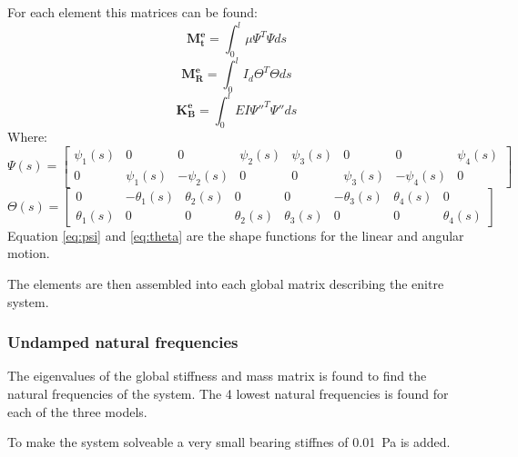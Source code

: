 For each element this matrices can be found:
\begin{equation}
    \mathbf{M_t^e} = \int_{0}^{l} \mu \Psi^T \Psi ds
    \label{eq:mass_matrix_linear}
\end{equation}
\begin{equation}
    \mathbf{M_R^e} = \int_{0}^{l} I_d \Theta^T \Theta ds
    \label{eq:mass_matrix_angular}
\end{equation}
\begin{equation}
    \mathbf{K_B^e} = \int_{0}^{l} E I \Psi''^T \Psi'' ds
\end{equation}
Where:
\begin{equation}
    \Psi(s) =
    \begin{bmatrix}
        \psi_1(s) & 0 & 0 & \psi_2(s) & \psi_3(s) & 0 & 0 & \psi_4(s) \\
        0 & \psi_1(s) & -\psi_2(s) & 0 & 0 & \psi_3(s) & -\psi_4(s) & 0
    \end{bmatrix}
    \label{eq:psi}
\end{equation}
\begin{equation}
    \Theta(s) = 
    \begin{bmatrix}
        0 & -\theta_1(s) & \theta_2(s) & 0 & 0 & -\theta_3(s) & \theta_4(s) & 0 \\
        \theta_1(s) & 0 & 0 & \theta_2(s) & \theta_3(s) & 0 & 0 & \theta_4(s)
    \end{bmatrix}
    \label{eq:theta}
\end{equation}
Equation \ref{eq:psi} and \ref{eq:theta} are the shape functions for the linear and angular motion.

The elements are then assembled into each global matrix describing the enitre system.

\subsubsection{Undamped natural frequencies}
The eigenvalues of the global stiffness and mass matrix is found to find the natural frequencies of the system. The 4 lowest natural frequencies is found for each of the three models.

To make the system solveable a very small bearing stiffnes of \SI{0.01}{\pascal} is added.

